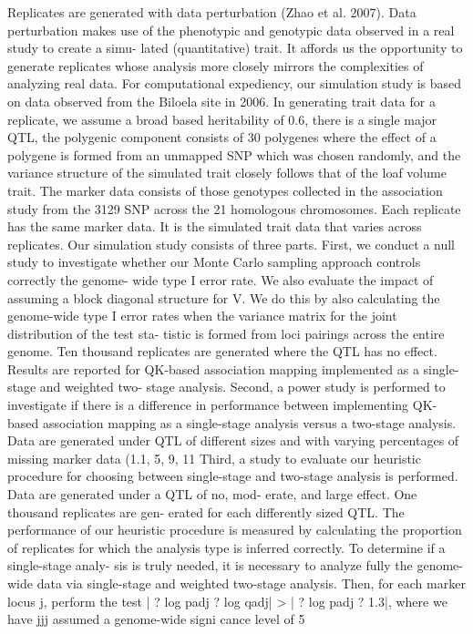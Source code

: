 \documentclass{nature}
\begin{document}
Replicates are generated with data perturbation (Zhao et al. 2007). Data perturbation makes use of the phenotypic and genotypic data observed in a real study to create a simu- lated (quantitative) trait. It affords us the opportunity to generate replicates whose analysis more closely mirrors the complexities of analyzing real data. For computational expediency, our simulation study is based on data observed from the Biloela site in 2006. In generating trait data for a replicate, we assume a broad based heritability of 0.6, there is a single major QTL, the polygenic component consists of 30 polygenes where the effect of a polygene is formed from an unmapped SNP which was chosen randomly, and the variance structure of the simulated trait closely follows that of the loaf volume trait. The marker data consists of those genotypes collected in the association study from the 3129 SNP across the 21 homologous chromosomes. Each replicate has the same marker data. It is the simulated trait data that varies across replicates.
Our simulation study consists of three parts. First, we conduct a null study to investigate whether our Monte Carlo sampling approach controls correctly the genome- wide type I error rate. We also evaluate the impact of assuming a block diagonal structure for V. We do this by
also calculating the genome-wide type I error rates when the variance matrix for the joint distribution of the test sta- tistic is formed from loci pairings across the entire genome. Ten thousand replicates are generated where the QTL has no effect. Results are reported for QK-based association mapping implemented as a single-stage and weighted two- stage analysis.
Second, a power study is performed to investigate if there is a difference in performance between implementing QK-based association mapping as a single-stage analysis versus a two-stage analysis. Data are generated under QTL of different sizes and with varying percentages of missing marker data (1.1, 5, 9, 11 %
Third, a study to evaluate our heuristic procedure for choosing between single-stage and two-stage analysis is performed. Data are generated under a QTL of no, mod- erate, and large effect. One thousand replicates are gen- erated for each differently sized QTL. The performance of our heuristic procedure is measured by calculating the proportion of replicates for which the analysis type is inferred correctly. To determine if a single-stage analy- sis is truly needed, it is necessary to analyze fully the genome-wide data via single-stage and weighted two-stage analysis. Then, for each marker locus j, perform the test
| ? log padj ? log qadj| > | ? log padj ? 1.3|, where we have jjj
assumed a genome-wide signi cance level of 5 %
\end{document}

